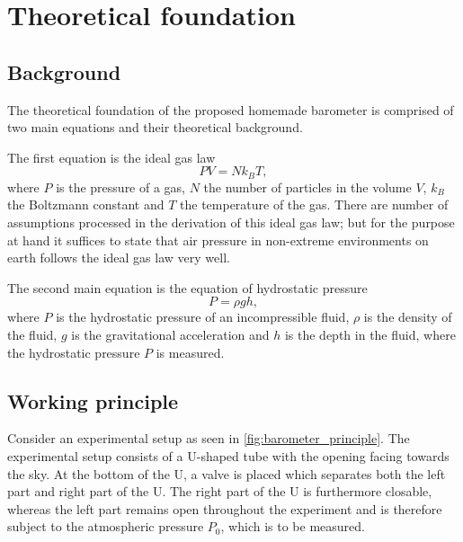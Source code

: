 \documentclass[a4paper,11pt, twocolumn]{article}
\begin{document}
\section{Theoretical foundation}
\subsection{Background}
The theoretical foundation of the proposed homemade barometer is comprised of two main equations and their theoretical background. 

The first equation is the ideal gas law \begin{equation}
	PV = Nk_B T,
\end{equation} where $P$ is the pressure of a gas, $N$ the number of particles in the volume $V$, $k_B$ the Boltzmann constant and $T$ the temperature of the gas. There are number of assumptions processed in the derivation of this ideal gas law; but for the purpose at hand it suffices to state that air pressure in non-extreme environments on earth follows the ideal gas law very well.

The second main equation is the equation of hydrostatic pressure \begin{equation}
	P = \rho g h,
\end{equation} where $P$ is the hydrostatic pressure of an incompressible fluid, $\rho$ is the density of the fluid, $g$ is the gravitational acceleration and $h$ is the depth in the fluid, where the hydrostatic pressure $P$ is measured.

\subsection{Working principle}
Consider an experimental setup as seen in \cref{fig:barometer_principle}. The experimental setup consists of a U-shaped tube with the opening facing towards the sky. At the bottom of the U, a valve is placed which separates both the left part and right part of the U. The right part of the U is furthermore closable, whereas the left part remains open throughout the experiment and is therefore subject to the atmospheric pressure $P_0$, which is to be measured. 
\end{document}
